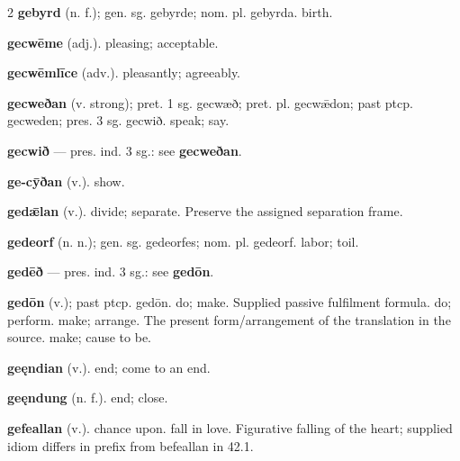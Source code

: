 \begin{multicols*}{2}
\textbf{gebyrd} (n. f.); gen. sg. gebyrde; nom. pl. gebyrda. birth.\par
\textbf{gecwēme} (adj.). pleasing; acceptable.\par
\textbf{gecwēmlīce} (adv.). pleasantly; agreeably.\par
\textbf{gecweðan} (v. strong); pret. 1 sg. gecwæð; pret. pl. gecwǣdon; past ptcp. gecweden; pres. 3 sg. gecwið. speak; say.\par
\textbf{gecwið} — pres. ind. 3 sg.: see \textbf{gecweðan}.\par
\textbf{ge-cȳðan} (v.). show.\par
\textbf{gedǣlan} (v.). divide; separate. Preserve the assigned separation frame.\par
\textbf{gedeorf} (n. n.); gen. sg. gedeorfes; nom. pl. gedeorf. labor; toil.\par
\textbf{gedēð} — pres. ind. 3 sg.: see \textbf{gedōn}.\par
\textbf{gedōn} (v.); past ptcp. gedōn. do; make. Supplied passive fulfilment formula. do; perform. make; arrange. The present form/arrangement of the translation in the source. make; cause to be.\par
\textbf{geęndian} (v.). end; come to an end.\par
\textbf{geęndung} (n. f.). end; close.\par
\textbf{gefeallan} (v.). chance upon. fall in love. Figurative falling of the heart; supplied idiom differs in prefix from befeallan in 42.1.\par

\end{multicols*}
